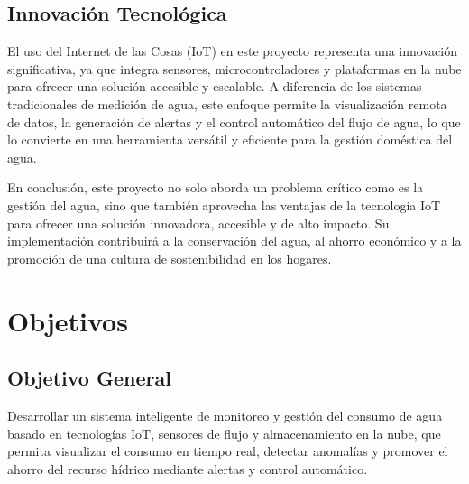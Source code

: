 \documentclass[conference]{IEEEtran}
\begin{document}
\subsection{Innovación Tecnológica}

El uso del Internet de las Cosas (IoT) en este proyecto representa una
innovación significativa, ya que integra sensores, microcontroladores y
plataformas en la nube para ofrecer una solución accesible y escalable. A
diferencia de los sistemas tradicionales de medición de agua, este enfoque
permite la visualización remota de datos, la generación de alertas y el control
automático del flujo de agua, lo que lo convierte en una herramienta versátil y
eficiente para la gestión doméstica del agua.

En conclusión, este proyecto no solo aborda un problema crítico como es la
gestión del agua, sino que también aprovecha las ventajas de la tecnología IoT
para ofrecer una solución innovadora, accesible y de alto impacto. Su
implementación contribuirá a la conservación del agua, al ahorro económico y a
la promoción de una cultura de sostenibilidad en los hogares.

\section{Objetivos}
\subsection{Objetivo General}
Desarrollar un sistema inteligente de monitoreo y gestión del consumo de agua
basado en tecnologías IoT, sensores de flujo y almacenamiento en la nube, que
permita visualizar el consumo en tiempo real, detectar anomalías y promover el
ahorro del recurso hídrico mediante alertas y control automático.
\end{document}
